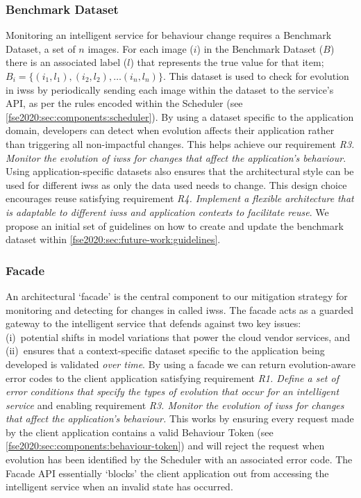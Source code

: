 \subsubsection{Benchmark Dataset} Monitoring an intelligent service for behaviour change requires a Benchmark Dataset, a set of $n$ images. For each image ($i$) in the Benchmark Dataset ($B$) there is an associated label ($l$) that represents the true value for that item; $B_{i} = \{(i_{1}, l_{1}), (i_{2}, l_{2}), \dots (i_{n}, l_{n})\}$. This dataset is used to check for evolution in \glspl{iws} by periodically sending each image within the dataset to the service's API, as per the rules encoded within the Scheduler (see \cref{fse2020:sec:components:scheduler}). By using a dataset specific to the application domain, developers can detect when evolution affects their application rather than triggering all non-impactful changes. This helps achieve our requirement \textit{R3. Monitor the evolution of \glspl{iws} for changes that affect the application’s behaviour}. Using application-specific datasets also ensures that the architectural style can be used for different \glspl{iws} as only the data used needs to change. This design choice encourages reuse satisfying requirement \textit{R4. Implement a flexible architecture that is adaptable to different \glspl{iws} and application contexts to facilitate reuse}. We propose an initial set of guidelines on how to create and update the benchmark dataset within \cref{fse2020:sec:future-work:guidelines}.

\subsubsection{Facade } An architectural `facade' is the central component to our mitigation strategy for monitoring and detecting for changes in called \glspl{iws}. The facade acts as a guarded gateway to the intelligent service that defends against two key issues: (i)~potential shifts in model variations that power the cloud vendor services, and (ii)~ensures that a context-specific dataset specific to the application being developed is validated \textit{over time}. By using a facade we can return evolution-aware error codes to the client application satisfying requirement \textit{R1. Define a set of error conditions that specify the types of evolution that occur for an intelligent service} and enabling requirement \textit{R3.  Monitor the evolution of \glspl{iws} for changes that affect the application’s behaviour.} This works by ensuring every request made by the client application contains a valid Behaviour Token (see \cref{fse2020:sec:components:behaviour-token}) and will reject the request when evolution has been identified by the Scheduler with an associated error code. The Facade API essentially `blocks' the client application out from accessing the intelligent service when an invalid state has occurred.



